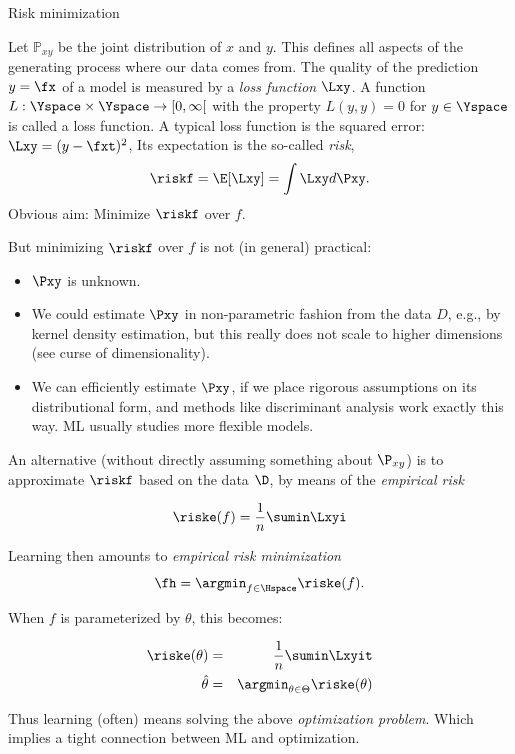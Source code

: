 \begin{vbframe}{Risk minimization}

Let \(\mathbb P_{xy}\) be the joint distribution of \(x\) and \(y\).
  This defines all aspects of the generating process where our data
  comes from. 
\vfill
The quality of the prediction $y=\fx$ of a model is measured by a \emph{loss function} $\Lxy $.
\vfill
A function $L :\Yspace \times \Yspace \rightarrow [0, \infty[$ with the property $L(y, y) = 0$ for $y \in  \Yspace$ is called a loss function.
\vfill
A typical loss function is the squared error: $\Lxy = (y-\fxt)^2$,
\vfill
Its expectation is the so-called \emph{risk},
  $$ \riskf = \E [\Lxy] = \int \Lxy d\Pxy. $$
\vfill
 Obvious aim: Minimize $\riskf$ over $f$. 
  
\framebreak
  
But minimizing $\riskf$ over $f$ is not (in general) practical:

\begin{itemize}
\item $\Pxy$ is unknown.
\item We could estimate $\Pxy$ in non-parametric fashion from the data $D$, e.g., by kernel density
  estimation, but this really does not scale to higher dimensions (see curse of dimensionality).
\item We can efficiently estimate $\Pxy$, if we place rigorous assumptions on its distributional form,
  and methods like discriminant analysis work exactly this way. ML usually studies more flexible models.
\end{itemize}


\framebreak

An alternative (without directly assuming something about $\P_{xy}$) is to approximate $\riskf$ based on
the data $\D$, by means of the \emph{empirical risk}

$$
\riske(f) = \frac{1}{n} \sumin \Lxyi
$$

Learning then amounts to \emph{empirical risk minimization}
$$
\fh = \argmin_{f \in \Hspace} \riske(f).
$$

\framebreak

When $f$ is parameterized by $\theta$, this becomes:

\begin{eqnarray*}
\riske(\theta) & = & \frac{1}{n} \sumin \Lxyit \cr
\hat{\theta} & = & \argmin_{\theta \in \Theta} \riske(\theta)
\end{eqnarray*}

Thus learning (often) means solving the above \emph{optimization problem}.
Which implies a tight connection between ML and optimization.


\end{vbframe}

